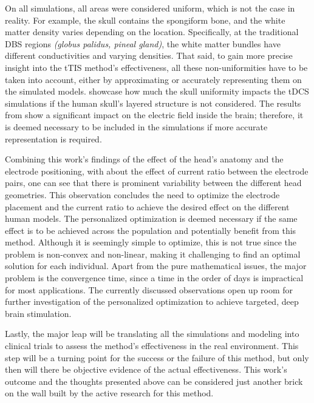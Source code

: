 On all simulations, all areas were considered uniform, which is not the case in reality. For example, the skull contains the spongiform bone, and the white matter density varies depending on the location. Specifically, at the traditional \gls{DBS} regions \textit{(globus palidus, pineal gland)}, the white matter bundles have different conductivities and varying densities. That said, to gain more precise insight into the \gls{tTIS} method's effectiveness, all these non-uniformities have to be taken into account, either by approximating or accurately representing them on the simulated models.  showcase how much the skull uniformity impacts the \gls{tDCS} simulations if the human skull's layered structure is not considered. The results from \cite{Rampersad2013_skull_approximations} show a significant impact on the electric field inside the brain; therefore, it is deemed necessary to be included in the simulations if more accurate representation is required.

Combining this work's findings of the effect of the head's anatomy and the electrode positioning, with  about the effect of current ratio between the electrode pairs, one can see that there is prominent variability between the different head geometries. This observation concludes the need to optimize the electrode placement and the current ratio to achieve the desired effect on the different human models. The personalized optimization is deemed necessary if the same effect is to be achieved across the population and potentially benefit from this method. Although it is seemingly simple to optimize, this is not true since the problem is non-convex and non-linear, making it challenging to find an optimal solution for each individual. Apart from the pure mathematical issues, the major problem is the convergence time, since a time in the order of days is impractical for most applications. The currently discussed observations open up room for further investigation of the personalized optimization to achieve targeted, deep brain stimulation.

Lastly, the major leap will be translating all the simulations and modeling into clinical trials to assess the method's effectiveness in the real environment. This step will be a turning point for the success or the failure of this method, but only then will there be objective evidence of the actual effectiveness. This work's outcome and the thoughts presented above can be considered just another brick on the wall built by the active research for this method.
